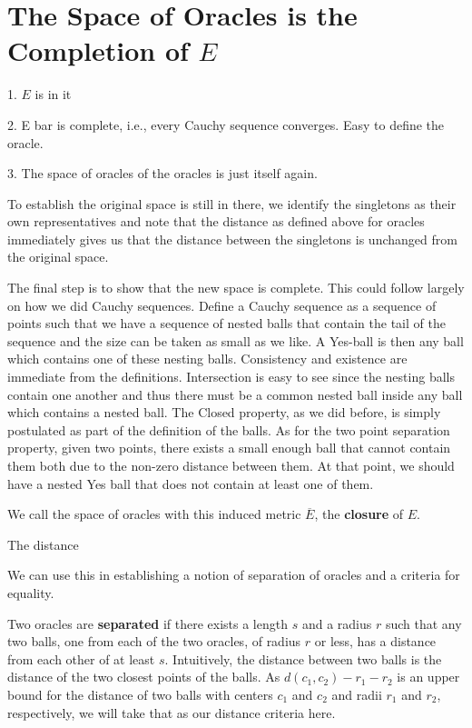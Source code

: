\documentclass[12pt]{article}
\begin{document}
\section{The Space of Oracles is the Completion of \texorpdfstring{$E$}{E}}

1. $E$ is in it

2. E bar is complete, i.e., every Cauchy sequence converges. Easy to define the oracle.

3. The space of oracles of the oracles is just itself again. 

To establish the original space is still in there, we identify the singletons as their own representatives and note that the distance as defined above for oracles immediately gives us that the distance between the singletons is unchanged from the original space. 

The final step is to show that the new space is complete. This could follow largely on how we did Cauchy sequences. Define a Cauchy sequence as a sequence of points such that we have a sequence of nested balls that contain the tail of the sequence and the size can be taken as small as we like. A Yes-ball is then any ball which contains one of these nesting balls. Consistency and existence are immediate from the definitions. Intersection is easy to see since the nesting balls contain one another and thus there must be a common nested ball inside any ball which contains a nested ball. The Closed property, as we did before, is simply postulated as part of the definition of the balls. As for the two point separation property, given two points, there exists a small enough ball that cannot contain them both due to the non-zero distance between them. At that point, we should have a nested Yes ball that does not contain at least one of them. 

We call the space of oracles with this induced metric $\overline{E}$, the \textbf{closure} of $E$.






The distance 

We can use this in establishing a notion of separation of oracles and a criteria for equality. 

Two oracles are \textbf{separated} if there exists a length $s$ and a radius $r$ such that any two balls, one from each of the two oracles, of radius $r$ or less, has a distance from each other of at least $s$. Intuitively, the distance between two balls is the distance of the two closest points of the balls. As $d(c_1, c_2) - r_1 - r_2$ is an upper bound for the distance of two balls with centers $c_1$ and $c_2$ and radii $r_1$ and $r_2$, respectively, we will take that as our distance criteria here. 
\end{document}
